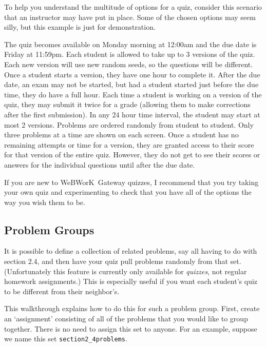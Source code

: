 \documentclass[12pt]{article}
\newcommand{\WW}{WeBWorK}
\begin{document}
To help you understand the multitude of options for a quiz, consider this scenario that an instructor may have put in place. Some of the chosen options may seem silly, but this example is just for demonstration. 

\hfill\begin{minipage}{0.9\textwidth}
The quiz becomes available on Monday morning at 12:00{\sc am} and the due date is Friday at 11:59{\sc pm}. Each student is allowed to take up to 3 versions of the quiz. Each new version will use new random seeds, so the questions will be different. Once a student starts a version, they have one hour to complete it. After the due date, an exam may not be started, but had a student started just before the due time, they do have a full hour.  Each time a student is working on a version of the quiz, they may submit it twice for a grade (allowing them to make corrections after the first submission).  In any 24 hour time interval, the student may start at most 2 versions. Problems are ordered randomly from student to student. Only three problems at a time are shown on each screen. Once a student has no remaining attempts or time for a version, they are granted access to their score for that version of the entire quiz. However, they do not get to see their scores or answers for the individual questions until after the due date.
\end{minipage}

If you are new to \WW\ Gateway quizzes, I recommend that you try taking your own quiz and experimenting to check that you have all of the options the way you wish them to be.

\subsection{Problem Groups}\label{groups}

It is possible to define a collection of related problems, say all having to do with section 2.4, and then have your quiz pull problems randomly from that set. (Unfortunately this feature is currently only available for \emph{quizzes}, not regular homework assignments.) This is especially useful if you want each student's quiz to be different from their neighbor's.

This walkthrough explains how to do this for such a problem group. First, create an `assignment' consisting of all of the problems that you would like to group together. There is no need to assign this set to anyone. For an example, suppose we name this set \texttt{section2\_4problems}. 
\end{document}
